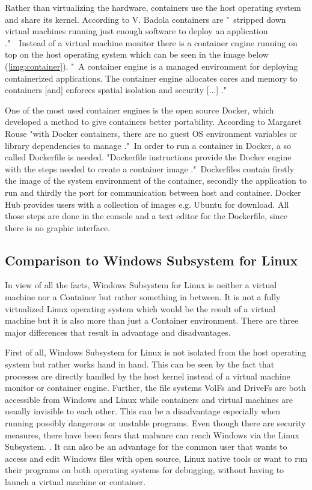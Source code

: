 \documentclass[utf8,biblatex, ngerman, english]{lni}
\begin{document}
Rather than virtualizing the hardware, containers use the host operating system and share its kernel. According to V. Badola containers are "\ stripped down virtual machines running just enough software to deploy an application \cite{Ba15}."\ \ Instead of a virtual machine monitor there is a container engine running on top on the host operating system which can be seen in the image below (\ref{img:container}). "\ A container engine is a managed environment for deploying containerized applications. The container engine allocates cores and memory to containers [and] enforces spatial isolation and security [...] \cite{Do17}."

One of the most used container engines is the open source Docker, which developed a method to give containers better portability. According to Margaret Rouse "with Docker containers, there are no guest OS environment variables or library dependencies to manage \cite{Ma}."\ In order to run a container in Docker, a so called Dockerfile is needed. "Dockerfile instructions provide the Docker engine with the steps needed to create a container image \cite{La16}."\ Dockerfiles contain firstly the image of the system environment of the container, secondly the application to run and thirdly the port for communication between host and container. Docker Hub provides users with a collection of images e.g. Ubuntu for download. All those steps are done in the console and a text editor for the Dockerfile, since there is no graphic interface.

\subsection{Comparison to Windows Subsystem for Linux}

In view of all the facts, Windows Subsystem for Linux is neither a virtual machine nor a Container but rather something in between. It is not a fully virtualized Linux operating system which would be the result of a virtual machine but it is also more than just a Container environment. There are three major differences that result in advantage and disadvantages. 

First of all, Windows Subsystem for Linux is not isolated from the host operating system but rather works hand in hand. This can be seen by the fact that processes are directly handled by the host kernel instead of a virtual machine monitor or container engine. Further, the file systems VolFs and DriveFs are both accessible from Windows and Linux while containers and virtual machines are usually invisible to each other. This can be a disadvantage especially when running possibly dangerous or unstable programs. Even though there are security measures, there have been fears that malware can reach Windows via the Linux Subsystem. \cite{Tu17}. It can also be an advantage for the common user that wants to access and edit Windows files with open source, Linux native tools or want to run their programs on both operating systems for debugging, without having to launch a virtual machine or container.
\end{document}
